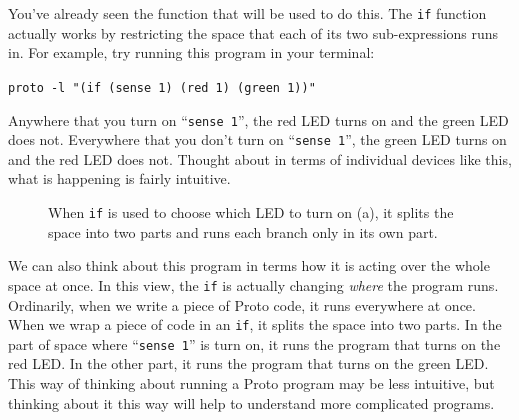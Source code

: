 \documentclass{article}
\newcommand\code[1]{\begin{center}\var{#1}\end{center}}
\newcommand\var[1]{{\tt #1}}
\newcommand\qvar[1]{``{\tt #1}''}
\begin{document}
You've already seen the function that will be used to do this.  The
\var{if} function actually works by restricting the space that each of
its two sub-expressions runs in.  For example, try running this
program in your terminal:

\code{proto -l "(if (sense 1) (red 1) (green 1))"}

Anywhere that you turn on \qvar{sense 1}, the red LED turns on and the
green LED does not.  Everywhere that you don't turn on \qvar{sense 1},
the green LED turns on and the red LED does not.  Thought about in
terms of individual devices like this, what is happening is fairly
intuitive.

\begin{figure}[ht]
\centering
{}
\caption{When \var{if} is used to choose which LED to turn on (a), it
  splits the space into two parts and runs each branch only in its own
  part.}
\label{f:restriction}
\end{figure}

We can also think about this program in terms how it is acting over
the whole space at once.  In this view, the \var{if} is actually
changing {\em where} the program runs.  Ordinarily, when we write a
piece of Proto code, it runs everywhere at once.  When we wrap a piece
of code in an \var{if}, it splits the space into two parts.  In the
part of space where \qvar{sense 1} is turn on, it runs the program
that turns on the red LED.  In the other part, it runs the program
that turns on the green LED.  This way of thinking about running a
Proto program may be less intuitive, but thinking about it this way
will help to understand more complicated programs.
\end{document}

